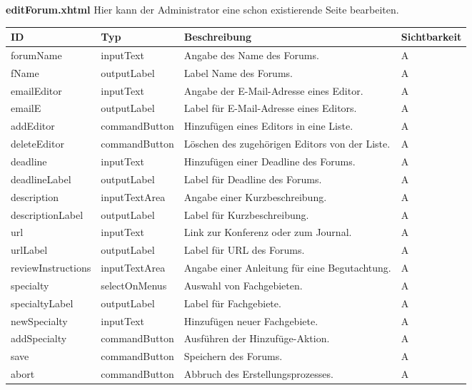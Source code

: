 \textbf{editForum.xhtml} Hier kann der Administrator eine schon existierende Seite bearbeiten.

\begin{tabular}[H]{|m{2cm}|m{3cm}|m{6cm}|m{2.5cm}|}
    \hline
    \textbf{ID} & \textbf{Typ} & \textbf{Beschreibung} & \textbf{Sichtbarkeit} \\
    \hline
    \hline
    forumName & inputText & Angabe des Name des Forums. & A\\
    \hline
    fName & outputLabel & Label Name des Forums. & A\\
    \hline
    emailEditor & inputText & Angabe der E-Mail-Adresse eines Editor. & A\\
    \hline
    emailE & outputLabel & Label für E-Mail-Adresse eines Editors. & A\\
    \hline
    addEditor & commandButton & Hinzufügen eines Editors in eine Liste. & A\\
    \hline
    deleteEditor & commandButton & Löschen des zugehörigen Editors von der Liste. & A\\
    \hline
    deadline & inputText & Hinzufügen einer Deadline des Forums. & A\\
    \hline
    deadlineLabel & outputLabel & Label für Deadline des Forums. & A\\
    \hline
    description & inputTextArea & Angabe einer Kurzbeschreibung. & A\\
    \hline
    descriptionLabel & outputLabel & Label für Kurzbeschreibung. & A\\
    \hline
    url & inputText & Link zur Konferenz oder zum Journal. & A\\
    \hline
    urlLabel & outputLabel & Label für URL des Forums. & A\\
    \hline
    reviewInstructions  & inputTextArea & Angabe einer Anleitung für eine Begutachtung. & A\\
    \hline
    specialty & selectOnMenus & Auswahl von Fachgebieten. & A\\
    \hline
    specialtyLabel & outputLabel & Label für Fachgebiete. & A\\
    \hline
    newSpecialty & inputText & Hinzufügen neuer Fachgebiete. & A\\
    \hline
    addSpecialty & commandButton & Ausführen der Hinzufüge-Aktion. & A\\
    \hline
    save & commandButton & Speichern des Forums. & A\\
    \hline
    abort & commandButton & Abbruch des Erstellungsprozesses. & A\\
    \hline
\end{tabular}

